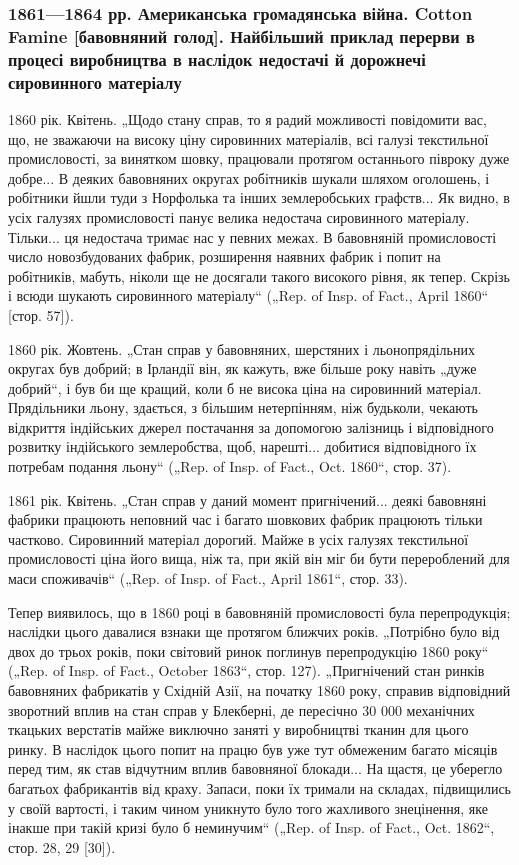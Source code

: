 
\subsubsection{1861—1864 рр. Американська громадянська війна. Cotton Famine [бавовняний
голод]. Найбільший приклад перерви в процесі виробництва в наслідок
недостачі й дорожнечі сировинного матеріалу}

1860 рік. Квітень. „Щодо стану справ, то я радий можливості
повідомити вас, що, не зважаючи на високу ціну сировинних
матеріалів, всі галузі текстильної промисловості, за винятком
шовку, працювали протягом останнього півроку дуже добре...
В деяких бавовняних округах робітників шукали шляхом оголошень,
і робітники йшли туди з Норфолька та інших землеробських
графств... Як видно, в усіх галузях промисловості панує велика недостача
сировинного матеріалу. Тільки... ця недостача тримає нас
у певних межах. В бавовняній промисловості число новозбудованих
фабрик, розширення наявних фабрик і попит на робітників,
мабуть, ніколи ще не досягали такого високого рівня, як
тепер. Скрізь і всюди шукають сировинного матеріалу“ („Rep.
of Insp. of Fact., April 1860“ [стор. 57]).

1860 рік. Жовтень. „Стан справ у бавовняних, шерстяних
і льонопрядільних округах був добрий; в Ірландії він, як кажуть,
вже більше року навіть „дуже добрий“, і був би ще кращий,
коли б не висока ціна на сировинний матеріал. Прядільники
льону, здається, з більшим нетерпінням, ніж будьколи,
чекають відкриття індійських джерел постачання за допомогою
залізниць і відповідного розвитку індійського землеробства, щоб,
нарешті... добитися відповідного їх потребам подання льону“
(„Rep. of Insp. of Fact., Oct. 1860“, стор. 37).

1861 рік. Квітень. „Стан справ у даний момент пригнічений...
деякі бавовняні фабрики працюють неповний час і багато шовкових
фабрик працюють тільки частково. Сировинний матеріал
дорогий. Майже в усіх галузях текстильної промисловості
ціна його вища, ніж та, при якій він міг би бути перероблений
для маси споживачів“ („Rep. of Insp. of Fact., April 1861“, стор. 33).

Тепер виявилось, що в 1860 році в бавовняній промисловості
була перепродукція; наслідки цього давалися взнаки ще протягом
ближчих років. „Потрібно було від двох до трьох років,
поки світовий ринок поглинув перепродукцію 1860 року“ („Rep.
of Insp. of Fact., October 1863“, стор. 127). „Пригнічений стан
ринків бавовняних фабрикатів у Східній Азії, на початку 1860 року,
справив відповідний зворотний вплив на стан справ у Блекберні,
де пересічно 30 000 механічних ткацьких верстатів майже виключно
заняті у виробництві тканин для цього ринку. В наслідок
цього попит на працю був уже тут обмеженим багато місяців
перед тим, як став відчутним вплив бавовняної блокади...
На щастя, це уберегло багатьох фабрикантів від краху. Запаси,
поки їх тримали на складах, підвищились у своїй вартості, і таким
чином уникнуто було того жахливого знецінення, яке
інакше при такій кризі було б неминучим“ („Rep. of Insp. of
Fact., Oct. 1862“, стор. 28, 29 [30]).
